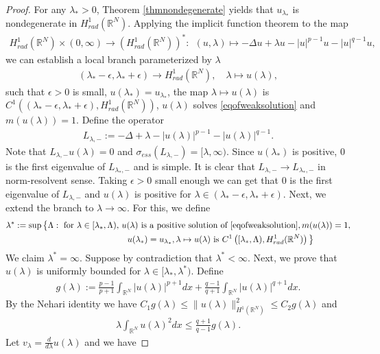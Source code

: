 \documentclass{article}
\theoremstyle{definition} \theoremstyle{remark}
\numberwithin{equation}{section}
\newcommand{\R}{\mathbb{R}}
\newcommand{\la}{\lambda}
\newcommand{\ep}{\epsilon}
\begin{document}
\begin{proof}
		For any $\la_* > 0$, Theorem \ref{thmnondegenerate} yields that $u_{\la_*}$ is nondegenerate in $H_{rad}^1(\R^N)$. Applying the implicit function theorem to the map
		\begin{align*}
			H^1_{rad}(\R^N) \times (0,\infty) \to \left(H^1_{rad}(\R^N)\right)^*: ~~ (u,\la) \mapsto -\Delta u + \la u - |u|^{p-1}u - |u|^{q-1}u,
		\end{align*}
		we can establish a local branch parameterized by $\la$
		\begin{align*}
			(\la_*-\ep,\la_*+\ep) \to H_{rad}^1(\R^N), \quad \la \mapsto u(\la),
		\end{align*}
		such that $\ep > 0$ is small, $u(\la_*) = u_{\la_*}$, the map $\la \mapsto u(\la)$ is $C^1\left((\la_*-\ep,\la_*+\ep), H_{rad}^1(\R^N)\right)$, $u(\la)$ solves \eqref{eqofweaksolution} and $m(u(\la)) = 1$. Define the operator
		\begin{align*}
			L_{\la,-} := -\Delta + \la - |u(\la)|^{p-1} - |u(\la)|^{q-1}.
		\end{align*}
		Note that $L_{\la,-}u(\la) = 0$ and $\sigma_{ess}(L_{\la,-}) = [\la,\infty)$. Since $u(\la_*)$ is positive, $0$ is the first eigenvalue of $L_{\la_*,-}$ and is simple. It is clear that $L_{\la,-} \to L_{\la_*,-}$ in norm-resolvent sense. Taking $\ep > 0$ small enough we can get that $0$ is the first eigenvalue of $L_{\la,-}$ and $u(\la)$ is positive for $\la \in (\la_*-\ep,\la_*+\ep)$. Next, we extend the branch to $\la \to \infty$. For this, we define
		\begin{align*}
			\la^* := \sup \big\{\Lambda: \text{ for } \la \in [\la_*,\Lambda), & ~ u(\la) \text{ is a positive solution of } \eqref{eqofweaksolution}, m(u(\la)) = 1,\\
			& ~~~ u(\la_*) = u_{\la_*}, \la \mapsto u(\la) \text{ is } C^1\left([\la_*,\Lambda), H_{rad}^1(\R^N)\right) \big\}
		\end{align*}
		We claim $\la^* = \infty$. Suppose by contradiction that $\la^* < \infty$. Next, we prove that $u(\la)$ is uniformly bounded for $\la \in [\la_*,\la^*)$. Define
		\begin{align*}
			g(\la) := \frac{p-1}{p+1}\int_{\R^N}|u(\la)|^{p+1}dx + \frac{q-1}{q+1}\int_{\R^N}|u(\la)|^{q+1}dx.
		\end{align*}
		By the Nehari identity we have $C_1g(\la) \le \|u(\la)\|_{H^1(\R^N)}^2 \le C_2g(\la)$ and
		\begin{align*}
			\la \int_{\R^N}u(\la)^2dx \le \frac{q+1}{q-1} g(\la).
 		\end{align*}
		Let $v_\la = \frac{d}{d \la}u(\la)$ and we have

\end{proof}
\end{document}
